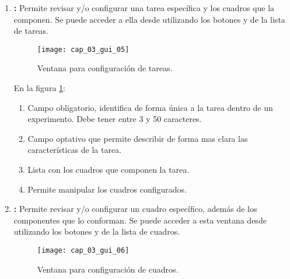 \documentclass[\main/main.tex]{subfiles}
\begin{document}
\begin{enumerate}
				\item \textbf{:} Permite revisar y/o configurar una tarea específica y los cuadros que la componen. Se puede acceder a ella desde  utilizando los botones  y  de la lista de tareas.
				\begin{figure}[H]
					\centering
					\texttt{[image: cap\_03\_gui\_05]}
					\caption{Ventana para configuración de tareas.}
					\label{fig:03_gui_tes}
				\end{figure}

				\vspace{-5mm}

				En la figura \ref{fig:03_gui_tes}:
				\begin{enumerate}[(1)]\setlength\itemsep{-0.5em}
					\item Campo obligatorio, identifica de forma única a la tarea dentro de un experimento. Debe tener entre 3 y 50 caracteres.
					\item Campo optativo que permite describir de forma mas clara las características de la tarea.
					\item Lista con los cuadros que componen la tarea.
					\item Permite manipular los cuadros configurados.
				\end{enumerate}

				\item \textbf{:} Permite revisar y/o configurar un cuadro específico, además de los componentes que lo conforman. Se puede acceder a esta ventana desde  utilizando los botones  y  de la lista de cuadros. 
				\begin{figure}[H]
					\centering
					\texttt{[image: cap\_03\_gui\_06]}
					\caption{Ventana para configuración de cuadros.}
					\label{fig:03_gui_fra}
				\end{figure}

				\vspace{-5mm}


\end{enumerate}
\end{document}
